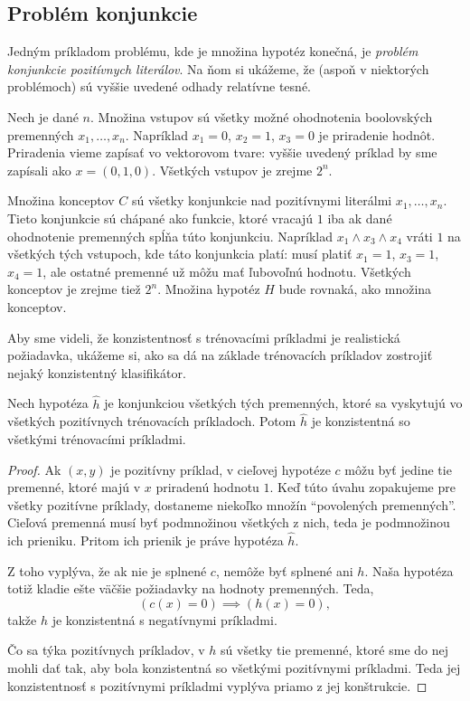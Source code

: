 \subsection{Problém konjunkcie}

Jedným príkladom problému, kde je množina hypotéz konečná, je
\emph{problém konjunkcie pozitívnych literálov}. Na ňom si ukážeme,
že (aspoň v niektorých problémoch) sú vyššie uvedené odhady relatívne
tesné.

Nech je dané $n$. Množina vstupov sú všetky možné ohodnotenia boolovských
premenných $x_1, \ldots, x_n$. Napríklad $x_1 = 0$, $x_2 = 1$, $x_3 = 0$
je priradenie hodnôt. Priradenia vieme zapísať vo vektorovom tvare:
vyššie uvedený príklad by sme zapísali ako $x = (0, 1, 0)$. Všetkých
vstupov je zrejme $2^n$.

Množina konceptov $C$ sú všetky konjunkcie nad pozitívnymi literálmi
$x_1, \ldots, x_n$. Tieto konjunkcie sú chápané ako funkcie, ktoré
vracajú $1$ iba ak dané ohodnotenie premenných spĺňa túto konjunkciu.
Napríklad $x_1 \land x_3 \land x_4$ vráti $1$ na všetkých tých vstupoch,
kde táto konjunkcia platí: musí platiť $x_1 = 1$, $x_3 = 1$, $x_4 = 1$,
ale ostatné premenné už môžu mať ľubovoľnú hodnotu. Všetkých konceptov
je zrejme tiež $2^n$. Množina hypotéz $H$ bude rovnaká, ako množina
konceptov.

Aby sme videli, že konzistentnosť s trénovacími príkladmi je realistická
požiadavka, ukážeme si, ako sa dá na základe trénovacích príkladov
zostrojiť nejaký konzistentný klasifikátor.
\begin{theorem}
  Nech hypotéza $\hat{h}$ je konjunkciou všetkých tých premenných, ktoré
  sa vyskytujú vo všetkých pozitívnych trénovacích príkladoch. Potom
  $\hat{h}$ je konzistentná so všetkými trénovacími príkladmi.
\end{theorem}
\begin{proof}
  Ak $(x, y)$ je pozitívny príklad, v cieľovej hypotéze $c$ môžu byť
  jedine tie premenné, ktoré majú v $x$ priradenú hodnotu $1$. Keď
  túto úvahu zopakujeme pre všetky pozitívne príklady, dostaneme
  niekoľko množín ``povolených premenných''. Cieľová premenná musí byť
  podmnožinou všetkých z nich, teda je podmnožinou ich prieniku. Pritom
  ich prienik je práve hypotéza $\hat{h}$.
  
  Z toho vyplýva, že ak nie je splnené $c$, nemôže byť splnené ani $h$.
  Naša hypotéza totiž kladie ešte väčšie požiadavky na hodnoty
  premenných. Teda,
  $$(c(x) = 0) \implies (h(x) = 0),$$
  takže $h$ je konzistentná s negatívnymi príkladmi.
  
  Čo sa týka pozitívnych príkladov, v $h$ sú všetky tie premenné, ktoré
  sme do nej mohli dať tak, aby bola konzistentná so všetkými pozitívnymi
  príkladmi. Teda jej konzistentnosť s pozitívnymi príkladmi vyplýva
  priamo z jej konštrukcie.
\end{proof}

